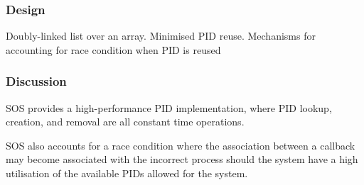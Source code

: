 \documentclass[a4paper,12pt]{article}
\begin{document}
\subsubsection{Design}
Doubly-linked list over an array.
Minimised PID reuse.
Mechanisms for accounting for race condition when PID is reused

\subsubsection{Discussion}
SOS provides a high-performance PID implementation, where PID lookup,
creation, and removal are all constant time operations.

SOS also accounts for a race condition where the association between a
callback may become associated with the incorrect process should the system
have a high utilisation of the available PIDs allowed for the system.
\end{document}
